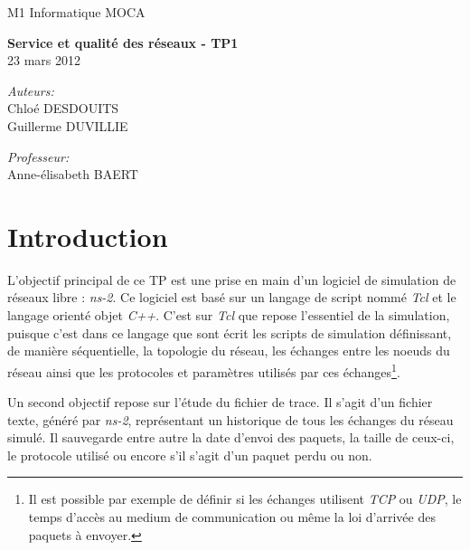 \documentclass[a4paper]{article}
\begin{document}
\Large
{}

\begin{titlepage}
\begin{flushright}
M1 Informatique MOCA
\end{flushright}
\vfill
\begin{center}
{ \huge \bfseries Service et qualité des réseaux - TP1}\\[0.5cm]
23 mars 2012\\[3cm]

\begin{minipage}[c][4cm][t]{0.4\textwidth}
\raggedright \large
\emph{Auteurs:}\\
Chloé DESDOUITS\\
Guillerme DUVILLIE
\end{minipage}
\begin{minipage}[c][4cm][t]{0.4\textwidth}
\raggedleft \large
\emph{Professeur:} \\
Anne-\'elisabeth BAERT
\end{minipage}

\vfill

\end{center}
\end{titlepage}

\normalsize

\tableofcontents
\thispagestyle{empty}
\newpage


\section{Introduction}

L'objectif principal de ce TP est une prise en main d'un logiciel de simulation de réseaux libre :
\emph{ns-2}. Ce logiciel est basé sur un langage de script nommé \emph{Tcl} et le langage orienté
objet \emph{C++}. C'est sur \emph{Tcl} que repose l'essentiel de la simulation, puisque c'est dans
ce langage que sont écrit les scripts de simulation définissant, de manière séquentielle, la
topologie du réseau, les échanges entre les noeuds du réseau ainsi que les protocoles et paramètres
utilisés par ces échanges\footnote{Il est possible par exemple de définir si les échanges utilisent
\emph{TCP} ou \emph{UDP}, le temps d'accès au medium de communication ou même la loi d'arrivée des
paquets à envoyer.}.

Un second objectif repose sur l'étude du fichier de trace. Il s'agit d'un fichier texte, généré par
\emph{ns-2}, représentant un historique de tous les échanges du réseau simulé. Il sauvegarde entre
autre la date d'envoi des paquets, la taille de ceux-ci, le protocole utilisé ou encore s'il s'agit
d'un paquet perdu ou non.
\end{document}
